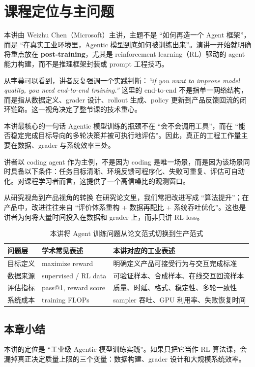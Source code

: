 \section{课程定位与主问题}

本讲由 Weizhu Chen（Microsoft）主讲，主题不是 ``如何再造一个 Agent 框架''，而是 ``在真实工业环境里，Agentic 模型到底如何被训练出来''。演讲一开始就明确将重点放在 \textbf{post-training}，尤其是 reinforcement learning（RL）驱动的 agent 能力构建，而不是推理框架封装或 prompt 工程技巧。

从字幕可以看到，讲者反复强调一个实践判断：\textit{``if you want to improve model quality, you need end-to-end training.''} 这里的 end-to-end 不是指单一网络结构，而是指从数据定义、grader 设计、rollout 生成、policy 更新到产品反馈回流的闭环链路。这一视角决定了整节课的技术重心。

\begin{importantbox}{本讲最核心的一句话}
Agentic 模型训练的瓶颈不在 ``会不会调用工具''，而在 ``能否稳定完成目标导向的多轮决策并被可执行地评估''。因此，真正的工程工作量主要在数据、grader 与系统效率三处。
\end{importantbox}

讲者以 coding agent 作为主例，不是因为 coding 是唯一场景，而是因为该场景同时具备以下条件：任务目标清晰、环境反馈可程序化、失败可重复、评估可自动化。对课程学习者而言，这提供了一个高信噪比的观测窗口。

\begin{knowledgebox}{从研究视角到产品视角的转换}
在研究论文里，我们常把改进写成 ``算法提升''；在产品中，改进往往来自 ``评价体系重构 + 数据再配比 + 系统吞吐优化''。这也是讲者为何将大量时间投入在数据和 grader 上，而非只讲 RL loss。
\end{knowledgebox}

\begin{table}[H]
\centering
\begin{tabular}{p{2.6cm}p{4.2cm}p{4.7cm}}
\toprule
\textbf{问题层} & \textbf{学术常见表述} & \textbf{本讲对应的工业表述} \\
\midrule
目标定义 & maximize reward & 明确定义产品可接受行为与交互完成标准 \\
数据来源 & supervised / RL data & 可验证样本、合成样本、在线交互回流样本 \\
评估指标 & pass@1, reward score & 质量、时延、格式、稳定性、多轮一致性 \\
系统成本 & training FLOPs & sampler 吞吐、GPU 利用率、失败恢复时间 \\
\bottomrule
\end{tabular}
\caption{本讲将 Agent 训练问题从论文范式切换到生产范式}
\end{table}

\subsection{本章小结}
本讲的定位是 ``工业级 Agentic 模型训练实践''。如果只把它当作 RL 算法课，会漏掉真正决定质量上限的三个变量：数据构建、grader 设计和大规模系统效率。

